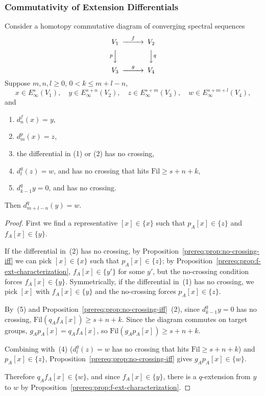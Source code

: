 \subsubsection{Commutativity of Extension Differentials}\label{sec:prereq-commutativity}

\begin{theorem}\label{prereq:thm:four-spectra}
    \leanok
    Consider a homotopy commutative diagram of converging spectral sequences
    $$\begin{CD}
    V_1 @>{f}>> V_2 \\
    @V{p}VV @VV{q}V \\
    V_3 @>{g}>> V_4
    \end{CD}$$
    Suppose $m, n, l \ge 0$, $0 < k \le m + l - n$,
    $$x \in E_\infty^{s}(V_1), \quad y \in E_\infty^{s+n}(V_2), \quad z \in E_\infty^{s+m}(V_3), \quad w \in E_\infty^{s+m+l}(V_4),$$
    and
    \begin{enumerate}
        \item $d_n^f(x) = y$,
        \item $d_m^p(x) = z$,
        \item the differential in (1) or (2) has no crossing,
        \item $d_l^g(z) = w$, and has no crossing that hits $\mathrm{Fil} \ge s + n + k$,
        \item $d_{k-1}^q y = 0$, and has no crossing.
    \end{enumerate}
    Then $d_{m+l-n}^q(y) = w$.
\end{theorem}
\begin{proof}
    First we find a representative $[x] \in \{x\}$ such that $p_A[x] \in \{z\}$ and $f_A[x] \in \{y\}$.

    If the differential in~(2) has no crossing, by Proposition~\ref{prereq:prop:no-crossing-iff} we can pick $[x] \in \{x\}$ such that $p_A[x] \in \{z\}$; by Proposition~\ref{prereq:prop:f-ext-characterization}, $f_A[x] \in \{y'\}$ for some $y'$, but the no-crossing condition forces $f_A[x] \in \{y\}$. Symmetrically, if the differential in~(1) has no crossing, we pick $[x]$ with $f_A[x] \in \{y\}$ and the no-crossing forces $p_A[x] \in \{z\}$.

    By~(5) and Proposition~\ref{prereq:prop:no-crossing-iff}~(2), since $d_{k-1}^q y = 0$ has no crossing, $\mathrm{Fil}(q_A f_A[x]) \ge s + n + k$. Since the diagram commutes on target groups, $g_A p_A[x] = q_A f_A[x]$, so $\mathrm{Fil}(g_A p_A[x]) \ge s + n + k$.

    Combining with~(4) ($d_l^g(z) = w$ has no crossing that hits $\mathrm{Fil} \ge s + n + k$) and $p_A[x] \in \{z\}$, Proposition~\ref{prereq:prop:no-crossing-iff} gives $g_A p_A[x] \in \{w\}$.

    Therefore $q_A f_A[x] \in \{w\}$, and since $f_A[x] \in \{y\}$, there is a $q$-extension from $y$ to $w$ by Proposition~\ref{prereq:prop:f-ext-characterization}.
\end{proof}

